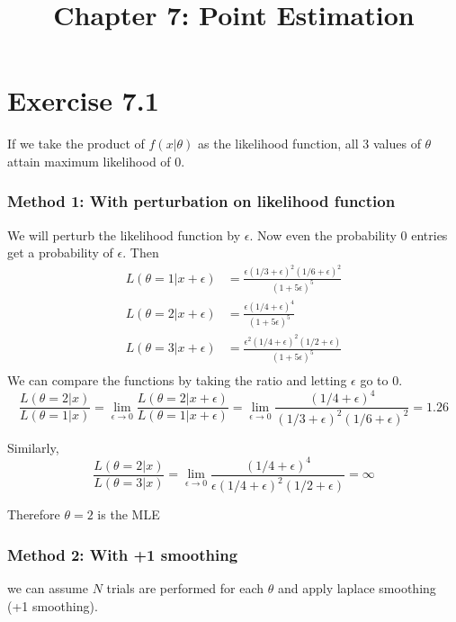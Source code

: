 \documentclass[12pt]{article}
\title{Chapter 7: Point Estimation}
\begin{document}
	\maketitle
	
\section*{Exercise 7.1}
 If we take the product of $f(x|\theta)$ as the likelihood function, all 3 values of $\theta$ attain maximum likelihood of 0. 
 
 \subsubsection*{Method 1: With perturbation on likelihood function}
 We will perturb the likelihood function by $\epsilon$. Now even the probability 0 entries get a probability of $\epsilon$. Then 
 \begin{equation*}
 	\begin{split}
 		L(\theta=1 | x + \epsilon) &= \frac{\epsilon (1/3 + \epsilon )^2 (1/6 + \epsilon)^2}{(1 + 5\epsilon)^5} \\
 		L(\theta=2 | x + \epsilon) &= \frac{\epsilon (1/4 + \epsilon )^4}{(1 + 5\epsilon)^5} \\
 		L(\theta=3 | x + \epsilon) &= \frac{\epsilon^2 (1/4 + \epsilon )^2 (1/2 + \epsilon)}{(1 + 5\epsilon)^5} \\
 	\end{split}
 \end{equation*}
 We can compare the functions by taking the ratio and letting $\epsilon$ go to 0.  
 $$
 \frac{ L(\theta = 2 | x ) }{ L(\theta = 1 | x) } = \lim_{\epsilon \rightarrow 0} \frac{ L(\theta = 2 | x + \epsilon) }{ L(\theta = 1 | x + \epsilon) } = \lim_{\epsilon \rightarrow 0} \frac{(1/4 + \epsilon )^4}{(1/3 + \epsilon )^2 (1/6 + \epsilon)^2} = 1.26
 $$

 Similarly, $$
 \frac{L(\theta = 2| x)} {L(\theta = 3 | x)} = \lim_{\epsilon \rightarrow 0} \frac{(1/4 + \epsilon )^4}{\epsilon (1/4 + \epsilon )^2 (1/2 + \epsilon)} = \infty$$
 
Therefore $\theta=2$ is the MLE

 \subsubsection*{Method 2: With +1 smoothing}
 we can assume $N$ trials are performed for each $\theta$ and apply laplace smoothing (+1 smoothing). 
 
\end{document}
